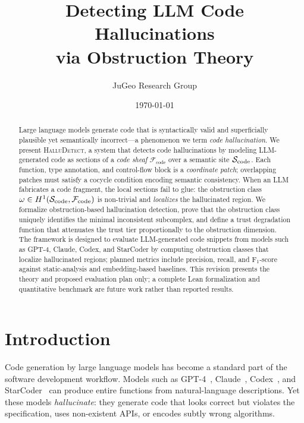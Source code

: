 \documentclass[11pt]{article}
\title{\textbf{Detecting LLM Code Hallucinations\\via Obstruction Theory}}
\author{%
  JuGeo Research Group
}
\date{\today}
\newcommand{\HalluDetect}{\textsc{HalluDetect}}
\newcommand{\CodeSheaf}{\mathcal{F}_{\mathrm{code}}}
\newcommand{\HalluClass}{\omega}
\newcommand{\CodeSite}{\Site_{\mathrm{code}}}
\begin{document}
\maketitle

\begin{abstract}
Large language models generate code that is syntactically valid and
superficially plausible yet semantically incorrect---a phenomenon we
term \emph{code hallucination}.  We present \HalluDetect, a system
that detects code hallucinations by modeling LLM-generated code as
sections of a \emph{code sheaf} $\CodeSheaf$ over a semantic site
$\CodeSite$.  Each function, type annotation, and control-flow
block is a \emph{coordinate patch}; overlapping patches must satisfy
a cocycle condition encoding semantic consistency.  When an LLM
fabricates a code fragment, the local sections fail to glue: the
obstruction class $\HalluClass \in \Hcoh{1}(\CodeSite, \CodeSheaf)$
is non-trivial and \emph{localizes} the hallucinated region.  We
formalize obstruction-based hallucination detection, prove that the
obstruction class uniquely identifies the minimal inconsistent
subcomplex, and define a trust degradation function that attenuates
the trust tier proportionally to the obstruction dimension.
The framework is designed to evaluate LLM-generated code snippets
from models such as GPT-4, Claude, Codex, and StarCoder by
computing obstruction classes that localize hallucinated regions;
planned metrics include precision, recall, and F$_1$-score against
static-analysis and embedding-based baselines. This revision presents the
theory and proposed evaluation plan only; a complete Lean formalization and
quantitative benchmark are future work rather than reported results.
\end{abstract}

\newpage

\section{Introduction}\label{sec:intro}

Code generation by large language models has become a standard part of
the software development workflow.  Models such as GPT-4~\cite{OpenAI2023},
Claude~\cite{Anthropic2024}, Codex~\cite{Chen2021}, and
StarCoder~\cite{Li2023starcoder} can produce entire functions from
natural-language descriptions.  Yet these models \emph{hallucinate}:
they generate code that looks correct but violates the specification,
uses non-existent APIs, or encodes subtly wrong algorithms.
\end{document}
